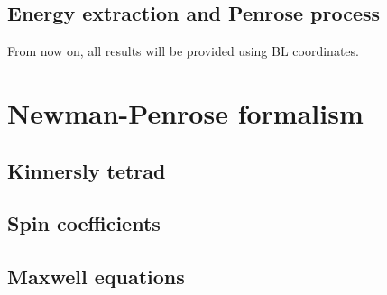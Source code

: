 \subsection{Energy extraction and Penrose process}



From now on, all results will be provided using BL coordinates.

\section{Newman-Penrose formalism}

\subsection{Kinnersly tetrad}
\subsection{Spin coefficients}
\subsection{Maxwell equations}


\cleardoublepage